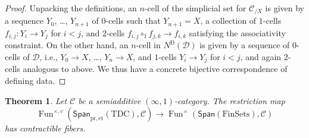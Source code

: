 \documentclass[a4paper,reqno]{amsart}
\theoremstyle{plain}
\newtheorem{theorem}{Theorem}[section]
\theoremstyle{definition}
\theoremstyle{remark}
\numberwithin{equation}{section}
\newcommand{\cC}{\mathcal{C}}
\newcommand{\cD}{\mathcal{D}}
\newcommand{\Span}{\mathsf{Span}}
\newcommand{\FinSets}{\mathrm{FinSets}}
\newcommand{\pret}{\mathrm{pr,\acute{e}t}}
\newcommand{\TDC}{\mathrm{TDC}}
\newcommand{\ND}{N^{\mathrm{D}}}
\DeclareMathOperator{\Fun}{Fun}
\begin{document}
\begin{proof}
Unpacking the definitions, an $n$-cell of the simplicial set for $\cC_{/X}$ is given by a sequence $Y_0$, \dots, $Y_{n+1}$ of $0$-cells such that $Y_{n+1} = X$, a collection of $1$-cells $f_{i, j} \colon Y_i \to Y_j$ for $i < j$, and $2$-cells $f_{i, j} \circ_1 f_{j, k} \to f_{i, k}$ satisfying the associativity constraint.
On the other hand, an $n$-cell in $\ND(\cD)$ is given by a sequence of $0$-cells of $\cD$, i.e., $Y_0 \to X$, \dots, $Y_n \to X$, and $1$-cells $Y_i \to Y_j$ for $i < j$, and again $2$-cells analogous to above.
We thus have a concrete bijective correspondence of defining data.
\end{proof}

\begin{theorem}\label{thm:additive-infty-ftrs-on-tdlc}
Let $\cC$ be a semiadditive $(\infty, 1)$-category.
The restriction map
\begin{equation}\label{eq:tdc-to-fin-res-map}
\Fun^{\times,c}(\Span_{\pret}(\TDC), \cC) \to \Fun^\times(\Span(\FinSets), \cC)
\end{equation}
has contractible fibers.
\end{theorem}
\end{document}
